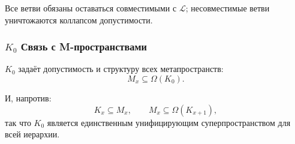 Все ветви обязаны оставаться совместимыми с $\mathcal{L}$; несовместимые
ветви уничтожаются коллапсом допустимости.

\subsubsection{\texorpdfstring{$K_0$}{K_0} Связь с M-пространствами}

$K_0$ задаёт допустимость и структуру всех метапространств:
\[
M_x \subseteq \Omega(K_0).
\]

И, напротив:
\[
K_x \subseteq M_x,
\qquad
M_x \subseteq \Omega(K_{x+1}),
\]
так что $K_0$ является единственным унифицирующим суперпространством для
всей иерархии.

